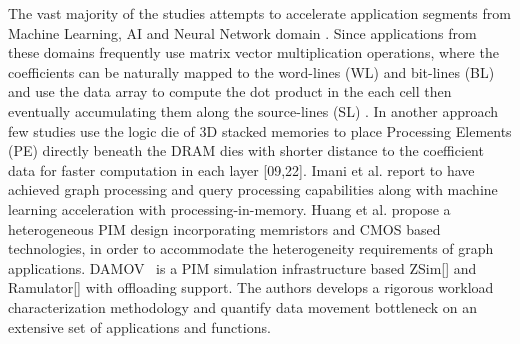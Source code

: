 The vast majority of the studies attempts to accelerate application segments from Machine Learning, AI and Neural Network domain \cite{03,04,08,09,10,11,14,15,16,18,19,20,22,29,31}. Since applications from these domains frequently use matrix vector multiplication operations, where the coefficients can be naturally mapped to the word-lines (WL) and bit-lines (BL) and use the data array to compute the dot product in the each cell then eventually accumulating them along the source-lines (SL) \cite{15,20}. In another approach few studies use the logic die of 3D stacked memories to place Processing Elements (PE) directly beneath the DRAM dies with shorter distance to the coefficient data for faster computation in each layer [09,22]. Imani et al. \cite{6} report to have achieved graph processing and query processing capabilities along with machine learning acceleration with processing-in-memory. Huang et al. \cite{33} propose a heterogeneous PIM design incorporating memristors and CMOS based technologies, in order to accommodate the heterogeneity requirements of graph applications. DAMOV~\cite{71} is a PIM simulation infrastructure based ZSim[] and Ramulator[] with offloading support. The authors develops a rigorous workload characterization methodology and quantify data movement bottleneck on an extensive set of applications and functions.     

